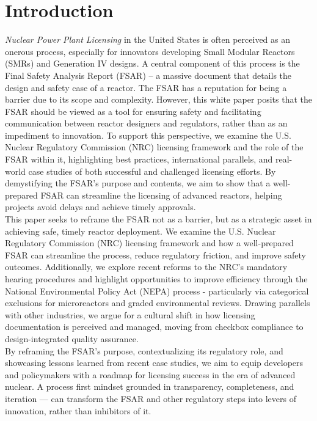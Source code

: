 \documentclass[5p,authoryear]{elsarticle}
\begin{document}
\section{Introduction}\label{introduction}
\emph{Nuclear Power Plant Licensing} in the United States is often perceived as an onerous process, especially for innovators developing Small Modular Reactors (SMRs) and Generation IV designs. A central component of this process is the Final Safety Analysis Report (FSAR) – a massive document that details the design and safety case of a reactor. The FSAR has a reputation for being a barrier due to its scope and complexity. However, this white paper posits that the FSAR should be viewed as a tool for ensuring safety and facilitating communication between reactor designers and regulators, rather than as an impediment to innovation. To support this perspective, we examine the U.S. Nuclear Regulatory Commission (NRC) licensing framework and the role of the FSAR within it, highlighting best practices, international parallels, and real-world case studies of both successful and challenged licensing efforts. By demystifying the FSAR’s purpose and contents, we aim to show that a well-prepared FSAR can streamline the licensing of advanced reactors, helping projects avoid delays and achieve timely approvals.\\

This paper seeks to reframe the FSAR not as a barrier, but as a strategic asset in achieving safe, timely reactor deployment. We examine the U.S. Nuclear Regulatory Commission (NRC) licensing framework and how a well-prepared FSAR can streamline the process, reduce regulatory friction, and improve safety outcomes. Additionally, we explore recent reforms to the NRC's mandatory hearing procedures and highlight opportunities to improve efficiency through the National Environmental Policy Act (NEPA) process - particularly via categorical exclusions for microreactors and graded environmental reviews. Drawing parallels with other industries, we argue for a cultural shift in how licensing documentation is perceived and managed, moving from checkbox compliance to design-integrated quality assurance.\\

By reframing the FSAR's purpose, contextualizing its regulatory role, and showcasing lessons learned from recent case studies, we aim to equip developers and policymakers with a roadmap for licensing success in the era of advanced nuclear. A process first mindset grounded in transparency, completeness, and iteration — can transform the FSAR and other regulatory steps into levers of innovation, rather than inhibitors of it.
\end{document}
